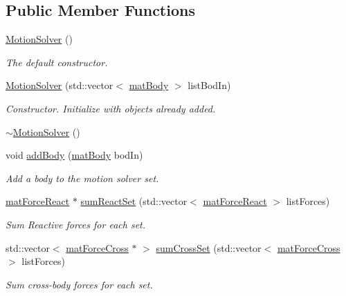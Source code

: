 \subsection*{Public Member Functions}
\begin{DoxyCompactItemize}
\item 
\hyperlink{classosea_1_1ofreq_1_1_motion_solver_a4dbc64bfeff4aab69a723c142292f787}{Motion\-Solver} ()
\begin{DoxyCompactList}\small\item\em The default constructor. \end{DoxyCompactList}\item 
\hyperlink{classosea_1_1ofreq_1_1_motion_solver_ab36901f6e752808a439890cde1c210ce}{Motion\-Solver} (std\-::vector$<$ \hyperlink{classosea_1_1ofreq_1_1mat_body}{mat\-Body} $>$ list\-Bod\-In)
\begin{DoxyCompactList}\small\item\em Constructor. Initialize with objects already added. \end{DoxyCompactList}\item 
\hyperlink{classosea_1_1ofreq_1_1_motion_solver_ae1fb5f389752a21a6d65ce41599b9b91}{$\sim$\-Motion\-Solver} ()
\item 
void \hyperlink{classosea_1_1ofreq_1_1_motion_solver_a79603cb6fede30d405f247a4d37256c1}{add\-Body} (\hyperlink{classosea_1_1ofreq_1_1mat_body}{mat\-Body} bod\-In)
\begin{DoxyCompactList}\small\item\em Add a body to the motion solver set. \end{DoxyCompactList}\item 
\hyperlink{classosea_1_1ofreq_1_1mat_force_react}{mat\-Force\-React} $\ast$ \hyperlink{classosea_1_1ofreq_1_1_motion_solver_ae30c84547cbbfdf32125b01fc34882e7}{sum\-React\-Set} (std\-::vector$<$ \hyperlink{classosea_1_1ofreq_1_1mat_force_react}{mat\-Force\-React} $>$ list\-Forces)
\begin{DoxyCompactList}\small\item\em Sum Reactive forces for each set. \end{DoxyCompactList}\item 
std\-::vector$<$ \hyperlink{classosea_1_1ofreq_1_1mat_force_cross}{mat\-Force\-Cross} $\ast$ $>$ \hyperlink{classosea_1_1ofreq_1_1_motion_solver_a791ca06422d61c08bfed2a887791b1bd}{sum\-Cross\-Set} (std\-::vector$<$ \hyperlink{classosea_1_1ofreq_1_1mat_force_cross}{mat\-Force\-Cross} $>$ list\-Forces)
\begin{DoxyCompactList}\small\item\em Sum cross-\/body forces for each set. \end{DoxyCompactList}\item 

\end{DoxyCompactItemize}
